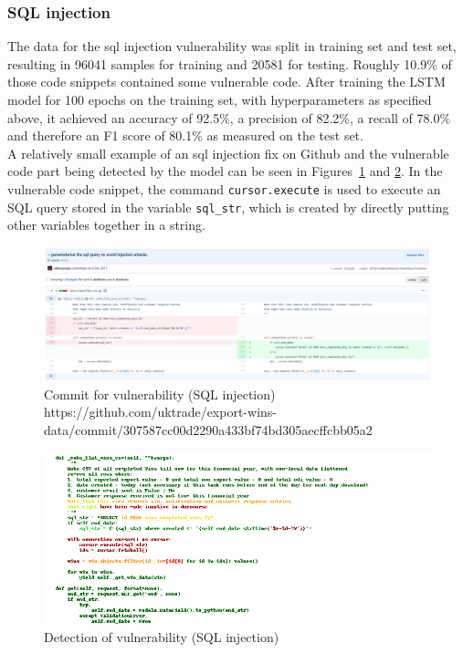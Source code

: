 \documentclass[
a4paper,
pagesize,
pdftex,
12pt,
ngerman,
fleqn,
final,
]{scrartcl}
\begin{document}
	\newpage
	
	\subsubsection{SQL injection}
	The data for the sql injection vulnerability was split in training set and test set, resulting in 96041 samples for training and 20581 for testing. Roughly 10.9\% of those code snippets contained some vulnerable code. After training the LSTM model for 100 epochs on the training set, with hyperparameters as specified above, it achieved an accuracy of 92.5\%, a precision of 82.2\%, a recall of 78.0\% and therefore an F1 score of 80.1\% as measured on the test set.\\
	A relatively small example of an sql injection fix on Github and the vulnerable code part being detected by the model can be seen in Figures~\ref{fig:sqlB} and \ref{fig:sqlBr}. In the vulnerable code snippet, the command \texttt{cursor.execute} is used to execute an SQL query stored in the variable \texttt{sql\_str}, which is created by directly putting other variables together in a string.
	
	\begin{figure}[H]
		\centering
		\includegraphics[width=\linewidth]{Images/sqlB}
		\caption{Commit for vulnerability (SQL injection) \newline \scriptsize{https://github.com/uktrade/export-wins-data/commit/307587cc00d2290a433bf74bd305aecffcbb05a2}}
		\label{fig:sqlB}
	\end{figure}
	\begin{figure}[H]
		\centering
		\includegraphics[width=\linewidth]{Images/sqlBr}
		\caption{Detection of vulnerability (SQL injection)}
		\label{fig:sqlBr}
	\end{figure}
\end{document}
